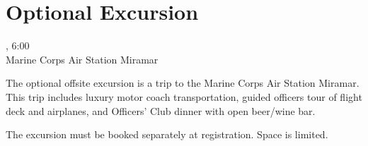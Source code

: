 \clearpage
\section{Optional Excursion}
\setheaders{}{\daydateyear}

\begin{center}

\daydateyear, 6:00 \vspace{1em}\\
Marine Corps Air Station Miramar\\
\end{center}

\label{Excursion}

The optional offsite excursion is a trip to the Marine Corps Air Station 
Miramar. This trip includes luxury motor coach transportation, guided 
officers tour of flight deck and airplanes, and Officers' Club dinner with 
open beer/wine bar.

The excursion must be booked separately at registration. Space is limited. 
